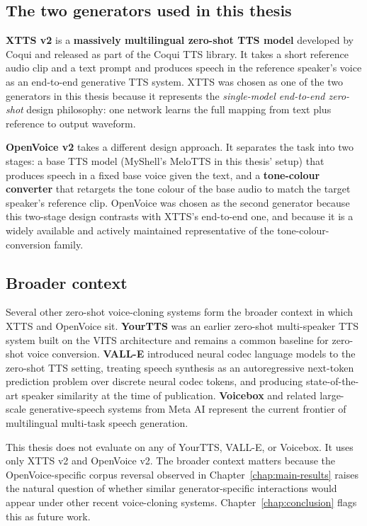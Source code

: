 \subsection{The two generators used in this thesis}
\label{sec:background-generators-used}

\textbf{XTTS v2} \cite{Casanova2024_XTTS} is a \textbf{massively
multilingual zero-shot TTS model} developed by Coqui and released
as part of the Coqui TTS library. It takes a short reference audio
clip and a text prompt and produces speech in the reference
speaker's voice as an end-to-end generative TTS system. XTTS was
chosen as one of the two generators in this thesis because it
represents the \emph{single-model end-to-end zero-shot} design
philosophy: one network learns the full mapping from text plus
reference to output waveform.

\textbf{OpenVoice v2} \cite{Qin2023_OpenVoice} takes a different
design approach. It separates the task into two stages: a base
TTS model (MyShell's MeloTTS in this thesis' setup) that produces
speech in a fixed base voice given the text, and a
\textbf{tone-colour converter} that retargets the tone colour of
the base audio to match the target speaker's reference clip.
OpenVoice was chosen as the second generator because this
two-stage design contrasts with XTTS's end-to-end one, and
because it is a widely available and actively maintained
representative of the tone-colour-conversion family.

\subsection{Broader context}
\label{sec:background-generators-context}

Several other zero-shot voice-cloning systems form the broader
context in which XTTS and OpenVoice sit. \textbf{YourTTS}
\cite{Casanova2022_YourTTS} was an earlier zero-shot multi-speaker
TTS system built on the VITS architecture and remains a common
baseline for zero-shot voice conversion. \textbf{VALL-E}
\cite{Wang2023_Valle} introduced neural codec language models to
the zero-shot TTS setting, treating speech synthesis as an
autoregressive next-token prediction problem over discrete neural
codec tokens, and producing state-of-the-art speaker similarity
at the time of publication. \textbf{Voicebox}
\cite{Le2023_Voicebox} and related large-scale generative-speech
systems from Meta AI represent the current frontier of
multilingual multi-task speech generation.

This thesis does not evaluate on any of YourTTS, VALL-E, or
Voicebox. It uses only XTTS v2 and OpenVoice v2. The broader
context matters because the OpenVoice-specific corpus reversal
observed in Chapter~\ref{chap:main-results} raises the natural
question of whether similar generator-specific interactions would
appear under other recent voice-cloning systems.
Chapter~\ref{chap:conclusion} flags this as future work.

